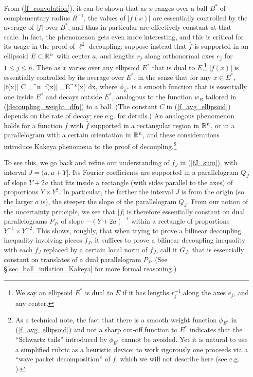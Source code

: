 \documentclass[brochure,english,12pt]{bourbaki}%
\begin{document}
From (\ref{f_convolution}), it can be shown that as $x$ ranges over a ball $B^*$ of complementary radius $R^{-1}$, the values of $|f(x)|$ are essentially controlled by the average of $|f|$ over $B^*$, and thus in particular are effectively constant at that scale. In fact, the phenomenon gets even more interesting, and this is critical for its usage in the proof of $\ell^2$ decoupling: suppose instead that $\hat{f}$ is supported in an ellipsoid $E \subset \mathbb{R}^n$ with center $a$, and lengths $r_j$ along orthonormal axes $e_j$ for $1 \leq j \leq n$. Then as $x$ varies over any ellipsoid $E^*$ that is dual to $E$,\footnote{We say an ellipsoid $E^*$ is dual to $E$ if it has lengths $r_j^{-1}$ along the axes $e_j$, and any center.} $|f(x)|$ is essentially controlled by its average over $E^*$, in the sense that for any $x \in E^*$, 
 \beq\label{f_avg_ellipsoid}
  |f(x)| \leq C  \int_{\R^n} |f(x)| \phi_{E^*}(x) dx,
 \eeq
 where $\phi_{E^*}$ is a smooth function that is essentially one inside $E^*$ and decays outside $E^*$, analogous to the function $w_B$ tailored in (\ref{decoupling_weight_dfn}) to a ball. (The constant $C$ in (\ref{f_avg_ellipsoid}) depends on the rate of decay; see e.g. \cite[Ch. 5]{Wol03} for details.)
 An analogous phenomenon holds for a function $f$ with $\hat{f}$ supported in a rectangular region in $\mathbb{R}^n$, or in a parallelogram with a certain orientation in $\mathbb{R}^n$, and these considerations introduce Kakeya phenomena to the proof of decoupling.\footnote{As a technical note, the fact that there is a smooth weight function $\phi_{E^*}$ in (\ref{f_avg_ellipsoid}) and not a sharp cut-off function to $E^*$ indicates that the ``Schwartz tails'' introduced by $\phi_{E^*}$ cannot be avoided. Yet it is natural to use a simplified rubric as a heuristic device; to work rigorously one proceeds via a ``wave packet decomposition'' of $f$, which we will not describe here (see e.g. \cite[Dfn. 3.2]{BouDem15}).}


To see this, we go back and refine our understanding of $f_J$ in (\ref{fJ_sum}), with interval $J=(a,a+Y]$. Its Fourier coefficients are supported in a parallelogram $Q_J$ of slope $Y+2a$ that fits inside a rectangle (with sides parallel to the axes) of  
 proportions $Y \times Y^2$. In particular, the farther the interval $J$ is from the origin (so the larger $a$ is), the steeper the slope of the parallelogram $Q_J$. From our notion of the uncertainty principle, we see that $|f|$ is therefore essentially constant on dual parallelograms $P_J$, of slope $-(Y+2a)^{-1}$ within a rectangle of proportions $Y^{-1} \times Y^{-2}$. This  shows, roughly, that when trying to prove a bilinear decoupling inequality involving pieces $f_J$, it suffices to prove a bilinear decoupling inequality with each $f_J$ replaced by a certain local norm of $f_J$, call it $G_J$, that is essentially constant on  translates of a dual parallelogram $P_J$. (See \S \ref{sec_ball_inflation_Kakeya} for more formal reasoning.) 
 
\end{document}
